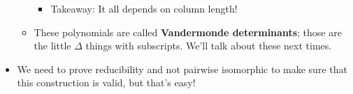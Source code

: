 \documentclass[../notes.tex]{subfiles}
\begin{document}
\begin{itemize}
\begin{itemize}
\begin{itemize}
            \item Takeaway: It all depends on column length!
        \end{itemize}
        \item These polynomials are called \textbf{Vandermonde determinants}; those are the little $\Delta$ things with subscripts. We'll talk about these next times.
    \end{itemize}
    \item We need to prove reducibility and not pairwise isomorphic to make sure that this construction is valid, but that's easy!
\end{itemize}
\end{document}
